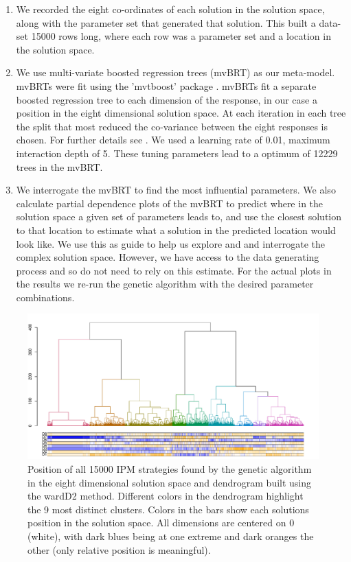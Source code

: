 \documentclass[12pt, a4paper]{article}
\begin{document}
\begin{enumerate}
\item We recorded the eight co-ordinates of each solution in the solution space, along with the parameter set that generated that solution. This built a data-set 15000 rows long, where each row was a parameter set and a location in the solution space.
\item We use multi-variate boosted regression trees (mvBRT) as our meta-model. mvBRTs were fit using the 'mvtboost' package \citep{Mill2016}. mvBRTs fit a separate boosted regression tree to each dimension of the response, in our case a position in the eight dimensional solution space. At each iteration in each tree the split that most reduced the co-variance between the eight responses is chosen. For further details see \citep{Mill2016}. We used a learning rate of 0.01, maximum interaction depth of 5. These tuning parameters lead to a optimum of 12229 trees in the mvBRT.
\item We interrogate the mvBRT to find the most influential parameters. We also calculate partial dependence plots of the mvBRT to predict where in the solution space a given set of parameters leads to, and use the closest solution to that location to estimate what a solution in the predicted location would look like. We use this as guide to help us explore and and interrogate the complex solution space. However, we have access to the data generating process and so do not need to rely on this estimate. For the actual plots in the results we re-run the genetic algorithm with the desired parameter combinations.                  
\end{enumerate}       

\begin{figure}[!h]
	\includegraphics[width=170mm]{MS_figs/dend_9clust_NMDS_8D.pdf}
	\caption{Position of all 15000 IPM strategies found by the genetic algorithm in the eight dimensional solution space and dendrogram built using the wardD2 method. Different colors in the dendrogram highlight the 9 most distinct clusters. Colors in the bars show each solutions position in the solution space. All dimensions are centered on 0 (white), with dark blues being at one extreme and dark oranges the other (only relative position is meaningful).} 
	\label{fig:clust_NMDS}
\end{figure}
\end{document}
